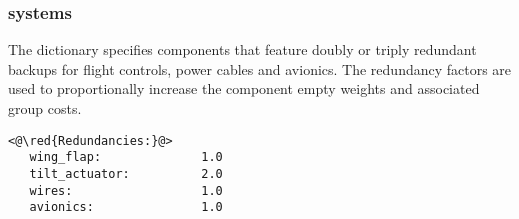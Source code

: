 \subsubsection{ systems}
The dictionary  specifies components that feature doubly or triply redundant backups for flight controls, power cables and avionics. The redundancy factors are used to proportionally increase the component empty weights and associated group costs. 

\begin{lstlisting}
<@\red{Redundancies:}@>
   wing_flap:              1.0 
   tilt_actuator:          2.0
   wires:                  1.0
   avionics:               1.0
\end{lstlisting}
